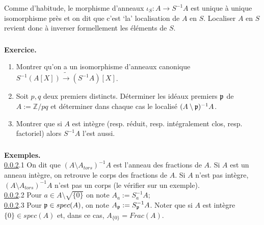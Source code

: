 \documentclass[a4paper, 12pt]{amsart}
\newcommand{\Z}{\mathbb{Z}}
\begin{document}
  Comme d'habitude, le morphisme d'anneaux  $\iota_S:A\rightarrow S^{-1}A$ est unique à unique isomorphisme près et on dit que  c'est `la' localisation de $A$ en $S$. Localiser $A$ en $S$ revient donc à inverser formellement les éléments de $S$.  \\
 
 \subsubsection{}\label{LocExo1}\textbf{Exercice.} 
 \begin{enumerate}
 \item  Montrer qu'on a un isomorphisme  d'anneaux canonique $S^{-1}(A[X])\tilde{\rightarrow} (S^{-1}A)[X]$.
 \item Soit $p,q$ deux premiers distincts. Déterminer les idéaux premiers $\frak{p}$ de $A:=\Z/pq$ et déterminer dans chaque cas le localisé $(A\setminus \frak{p})^{-1}A$.
 \item Montrer que si $A$ est intègre (resp. réduit, resp. intégralement clos, resp. factoriel) alors $S^{-1}A$ l'est aussi.\\
 \end{enumerate}
 
 
 
 \subsubsection{}\label{LocEx2}\textbf{Exemples.}\\

\ref{LocEx2}.1 On dit que $(A\setminus A_{tors})^{-1}A$ est l'anneau des fractions de $A$. Si $A$ est un anneau intègre, on retrouve le corps  des fractions de $A$. Si $A$ n'est pas intègre, $(A\setminus A_{tors})^{-1}A$ n'est pas un corps (le vérifier sur un exemple).\\

\ref{LocEx2}.2 Pour $a\in A\setminus \sqrt{\lbrace 0\rbrace}$ on note $A_a:=S_a^{-1}A $;\\

\ref{LocEx2}.3 Pour $\frak{p}\in spec(A)$, on note $A_\frak{p}:=S_{\frak{p}}^{-1}A$. Noter que si $A$ est intègre  $\lbrace 0\rbrace \in spec(A)$ et, dans ce cas, $A_{\lbrace 0\rbrace}=Frac(A)$.\\
\end{document}

